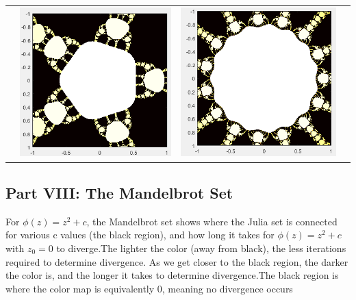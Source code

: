 \documentclass[11pt]{article}
\theoremstyle{plain}
\theoremstyle{definition}
\begin{document}
\begin{tabular}{c c c c}
	&\includegraphics*[scale = 0.23]{Plot15.png}
	&\includegraphics*[scale = 0.23]{Plot16.png}
\end{tabular}

\subsection*{Part VIII: The Mandelbrot Set }
For $  \phi(z)=z^2+c $, the Mandelbrot set shows where the Julia set is connected for various c values (the black region), and how long it takes for $ \phi(z)=z^2+c $ with $ z_0=0 $ to diverge.The lighter the color (away from black), the less iterations required to determine divergence. As we get closer to the black region, the darker the color is, and the longer it takes to determine divergence.The black region is where the color map is equivalently 0, meaning no divergence occurs
\end{document}
